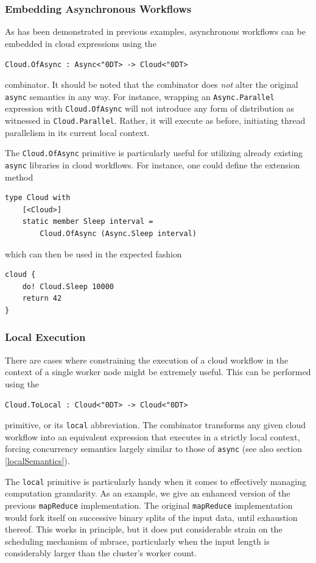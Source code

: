\documentclass[9pt,a4paper]{article}
\newcommand{\mbrace}{mbrace}
\newcommand{\centertt}[1]{\begin{center}\texttt{#1}\end{center}}
\newcommand{\uq}{\char"0D}
\begin{document}
\subsubsection*{Embedding Asynchronous Workflows}

As has been demonstrated in previous examples, asynchronous workflows can be
embedded in cloud expressions using the
\centertt{Cloud.OfAsync : Async<\uq{}T> -> Cloud<\uq{}T>}
combinator. It should be noted that the combinator does \emph{not} alter the
original \texttt{async} semantics in any way. For instance, wrapping an
\texttt{Async.Parallel} expression with \texttt{Cloud.OfAsync} will not introduce
any form of distribution as witnessed in \texttt{Cloud.Parallel}. Rather,
it will execute as before, initiating thread parallelism in its current
local context.

The \texttt{Cloud.OfAsync} primitive is particularly useful for utilizing
already existing \texttt{async} libraries in cloud workflows. For instance,
one could define the extension method
\begin{lstlisting}
type Cloud with
    [<Cloud>]
    static member Sleep interval = 
        Cloud.OfAsync (Async.Sleep interval)
\end{lstlisting}
which can then be used in the expected fashion
\begin{lstlisting}
cloud {
    do! Cloud.Sleep 10000
    return 42
}
\end{lstlisting}

\subsubsection*{Local Execution}
\label{localCombinator}

There are cases where constraining the execution of a cloud workflow in the context of a
single worker node might be extremely useful. This can be performed using the
\centertt{Cloud.ToLocal : Cloud<\uq{}T> -> Cloud<\uq{}T>}
primitive, or its \texttt{local} abbreviation. The combinator transforms any given
cloud workflow into an equivalent expression that executes in a strictly local context,
forcing concurrency semantics largely similar to those of \texttt{async} (see also section \ref{localSemantics}).

The \texttt{local} primitive is particularly handy when it comes to effectively managing 
computation granularity. As an example, we give an enhanced version of the previous 
\texttt{mapReduce} implementation. The original \texttt{mapReduce} implementation would 
fork itself on successive binary splits of the input data, until exhaustion thereof.
This works in principle, but it does put considerable strain on the scheduling mechanism of
\mbrace, particularly when the input length is considerably larger than the cluster's
worker count.
\end{document}
